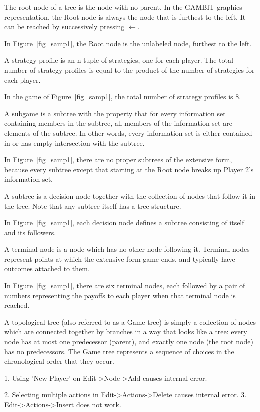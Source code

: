 \begin{helpglossary}
\label{rootnodegloss}
The root node of a tree is the node with no parent. In the GAMBIT graphics
representation, the Root node is always the node that is furthest to the
left.  It can be reached by successively pressing {\bf $\leftarrow$}. 

In Figure~\ref{fig_samp1}, the Root node is the unlabeled node, furthest to 
the left.

\label{stratprofgloss}
A strategy profile is an n-tuple of strategies, one for each player. The 
total number of strategy profiles is equal to the product of the number of 
strategies for each player. 
 
In the game of  Figure~\ref{fig_samp1}, the total number of strategy profiles
 is 8. 

\label{subgamegloss}
A subgame is a subtree with the property that for every information 
set containing members in the subtree, all members of the information 
set are elements of the subtree.  In other words, every information set 
is either contained in or has empty intersection with the subtree. 

In Figure~\ref{fig_samp1}, there are no proper subtrees of the extensive
form, because every subtree except that starting at the Root node breaks
up Player 2's information set.

\label{subtreegloss}
A subtree is a decision node together with the collection of nodes that
follow it in the tree.  Note that any subtree itself has a tree structure.

In Figure~\ref{fig_samp1}, each decision node defines a subtree consisting of itself
and its followers.   

\label{termnodegloss}
A terminal node is a node which has no other node following it.  Terminal 
nodes represent points at which the extensive form game ends, and typically 
have outcomes attached to them. 

In Figure~\ref{fig_samp1}, there are six terminal nodes, each followed by
a pair of numbers representing the payoffs to each player when that
terminal node is reached.

\label{toptreegloss}
A topological tree (also referred to as a Game tree) is simply a
collection of nodes which are connected together by branches in a way that
looks like a tree:  every node has at most one predecessor (parent), and exactly 
one node (the root node) has no predecessors.  
The Game tree represents a sequence of choices in the
chronological order that they occur. 

\end{helpglossary}

1.  Using 'New Player' on Edit->Node->Add causes internal error. 

2.  Selecting multiple actions in Edit->Actions->Delete causes internal error.  
3.  Edit->Actions->Insert does not work.  